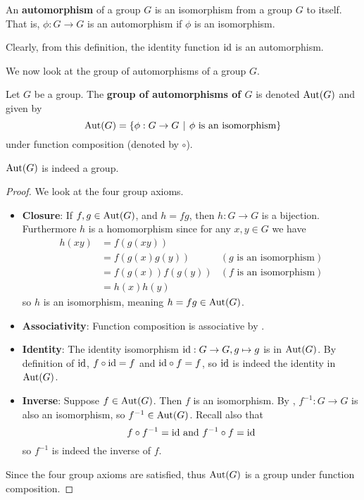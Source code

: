 \begin{definition}
    An \textbf{automorphism} of a group $G$ is an isomorphism from a group $G$ to itself. That is, $\phi: G \to G$ is an automorphism if $\phi$ is an isomorphism.
\end{definition}

Clearly, from this definition, the identity function $\mathrm{id}$ is an automorphism.

We now look at the group of automorphisms of a group $G$.
\begin{definition}
    Let $G$ be a group. The \textbf{group of automorphisms of $G$} is denoted $\mathrm{Aut}(G)$ and given by
    \[
        \Aut{G} = \{\phi: G \to G \vert \phi \text{ is an isomorphism}\}
    \]
    under function composition (denoted by $\circ$).
\end{definition}

\begin{proposition}
    $\mathrm{Aut}(G)$ is indeed a group.
\end{proposition}
\begin{proof}
    We look at the four group axioms.
    \begin{itemize}
        \item \textbf{Closure}: If $f, g \in \mathrm{Aut}(G)$, and $h = fg$, then $h: G \to G$ is a bijection. Furthermore $h$ is a homomorphism since for any $x, y \in G$ we have
        \begin{align*}
            h(xy) &= f(g(xy))\\
            &= f(g(x)g(y)) & (g \text{ is an isomorphism})\\
            &= f(g(x))f(g(y)) & (f \text{ is an isomorphism})\\
            &= h(x)h(y)
        \end{align*}
        so $h$ is an isomorphism, meaning $h = fg \in \mathrm{Aut}(G)$.

        \item \textbf{Associativity}: Function composition is associative by .

        \item \textbf{Identity}: The identity isomorphism $\mathrm{id}: G \to G, g \mapsto g$ is in $\mathrm{Aut}(G)$. By definition of $\mathrm{id}$, $f \circ \mathrm{id} = f$ and $\mathrm{id} \circ f = f$, so $\mathrm{id}$ is indeed the identity in $\mathrm{Aut}(G)$.

        \item \textbf{Inverse}: Suppose $f \in \mathrm{Aut}(G)$. Then $f$ is an isomorphism. By , $f^{-1}: G \to G$ is also an isomorphism, so $f^{-1} \in \mathrm{Aut}(G)$. Recall also that
        \[
            f\circ f^{-1} = \mathrm{id} \text{ and } f^{-1}\circ f = \mathrm{id}
        \]
        so $f^{-1}$ is indeed the inverse of $f$.
    \end{itemize}
    Since the four group axioms are satisfied, thus $\mathrm{Aut}(G)$ is a group under function composition.
\end{proof}

